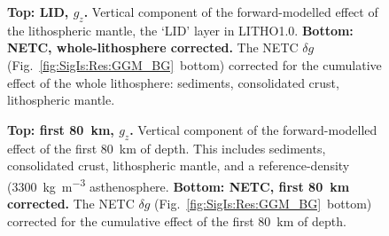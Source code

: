 \begin{figure}
    \begin{adjustbox}{center}
    \end{adjustbox}
    \caption[Map of the effect of the lithospheric mantle ($g_z$) and the NETC $\delta g$ corrected for the whole lithosphere (including sediments and crust).]{
        \textbf{Top: LID, $g_z$.} Vertical component of the forward-modelled effect of the lithospheric mantle, the `LID' layer in {LITHO1.0}.
        \textbf{Bottom: NETC, whole-lithosphere corrected.} The NETC $\delta g$ (Fig.~\ref{fig:SigIs:Res:GGM_BG}~bottom) corrected for the cumulative effect of the whole lithosphere: sediments, consolidated crust, lithospheric mantle.
    }
    \label{fig:SigIs:Res:LID}
\end{figure}

\begin{figure}
    \begin{adjustbox}{center}
    \end{adjustbox}
    \caption[Map of the effect of the first \SI{80}{\kilo \metre} of forward-modelled masses and NETC $\delta g$ corrected for them.]{
        \textbf{Top: first \SI{80}{\kilo \metre}, $g_z$.} Vertical component of the forward-modelled effect of the first \SI{80}{\kilo \metre} of depth. This includes sediments, consolidated crust, lithospheric mantle, and a reference-density (\SI{3300}{\kilo \gram \per \cubic \metre} asthenosphere.
        \textbf{Bottom: NETC, first \SI{80}{\kilo \metre} corrected.} The NETC $\delta g$ (Fig.~\ref{fig:SigIs:Res:GGM_BG}~bottom) corrected for the cumulative effect of the first \SI{80}{\kilo \metre} of depth.
    }
    \label{fig:SigIs:Res:Shallow}
\end{figure}

